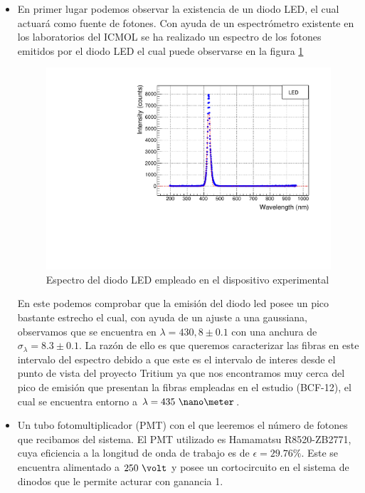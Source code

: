 \begin{itemize}
\item {} En primer lugar podemos observar la existencia de un diodo LED, el cual actuará como fuente de fotones. Con ayuda de un espectrómetro existente en los laboratorios del ICMOL se ha realizado un espectro de los fotones emitidos por el diodo LED el cual puede observarse en la figura \ref{espectroled}

\begin{figure}[H]
\centering
\includegraphics[scale=0.7]{Figuras/Plot_LED.pdf}
\caption{Espectro del diodo LED empleado en el dispositivo experimental\label{espectroled}}
\end{figure}

En este podemos comprobar que la emisión del diodo led posee un pico bastante estrecho el cual, con ayuda de un ajuste a una gaussiana, observamos que se encuentra en $\lambda=430,8 \pm 0.1$ con una anchura de $\sigma_{\lambda}=8.3\pm0.1$. La razón de ello es que queremos caracterizar las fibras en este intervalo del espectro debido a que este es el intervalo de interes desde el punto de vista del proyecto Tritium ya que nos encontramos muy cerca del pico de emisión que presentan la fibras empleadas en el estudio (BCF-12), el cual se encuentra entorno a $\lambda=435~\nano\meter$.

\item{} Un tubo fotomultiplicador (PMT) con el que leeremos el número de fotones que recibamos del sistema. El PMT utilizado es Hamamatsu R8520-ZB2771, cuya eficiencia a la longitud de onda de trabajo es de $\epsilon=29.76\%$. Este se encuentra alimentado a $250~\volt$ y posee un cortocircuito en el sistema de dinodos que le permite acturar con ganancia 1.


\end{itemize}
